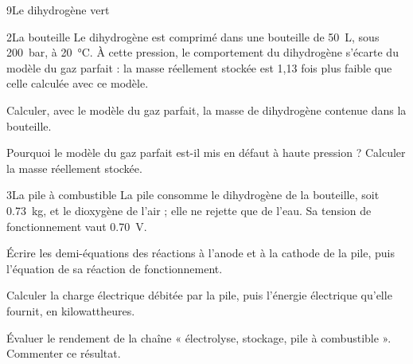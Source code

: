 \begin{exoBac}{9}{Le dihydrogène vert}
\begin{docu}{2}{La bouteille}
Le dihydrogène est comprimé dans une bouteille de \qty{50}{L}, sous \qty{200}{bar}, à \qty{20}{\degreeCelsius}. À cette pression, le comportement
du dihydrogène s'écarte du modèle du gaz parfait : la masse réellement stockée est 1,13 fois plus faible que celle
calculée avec ce modèle.
\end{docu}
\begin{questions}[resume]
\item Calculer, avec le modèle du gaz parfait, la masse de dihydrogène contenue dans la bouteille.
\item Pourquoi le modèle du gaz parfait est-il mis en défaut à haute pression ? Calculer la masse réellement stockée.
\end{questions}

\begin{docu}{3}{La pile à combustible}
La pile consomme le dihydrogène de la bouteille, soit \qty{0,73}{kg}, et le dioxygène de l'air ; elle ne rejette que de
l'eau. Sa tension de fonctionnement vaut \qty{0,70}{V}.
\end{docu}
\begin{questions}[resume]
\item Écrire les demi-équations des réactions à l'anode et à la cathode de la pile, puis l'équation de sa réaction de
fonctionnement.
\item Calculer la charge électrique débitée par la pile, puis l'énergie électrique qu'elle fournit, en kilowattheures.
\item \initiative Évaluer le rendement de la chaîne « électrolyse, stockage, pile à combustible ». Commenter ce résultat.
\end{questions}
\end{exoBac}

